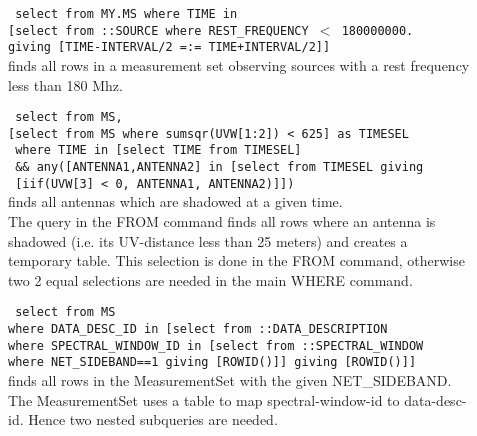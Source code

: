 \begin{description}
  \item[] \texttt{ select from MY.MS where TIME in}
      \\\texttt{[select from ::SOURCE where REST\_FREQUENCY $<$ 180000000.}
      \\\texttt{giving [TIME-INTERVAL/2 =:= TIME+INTERVAL/2]]}
      \\finds all rows in a measurement set observing sources with a
      rest frequency less than 180 Mhz.

  \item[] \texttt{ select from MS,}
      \\\texttt{[select from MS where sumsqr(UVW[1:2]) < 625] as TIMESEL}
      \\\texttt{ where TIME in [select TIME from TIMESEL]}
      \\\texttt{   \&\& any([ANTENNA1,ANTENNA2] in [select from TIMESEL giving}
      \\\texttt{                      [iif(UVW[3] < 0, ANTENNA1, ANTENNA2)]])}
      \\finds all antennas which are shadowed at a given time.
      \\The query in the FROM command finds all rows where an antenna
      is shadowed (i.e. its UV-distance less than 25 meters) and
      creates a temporary table. This selection is done in the FROM
      command, otherwise two 2 equal selections are needed in the main
      WHERE command.
      
  \item[] \texttt{ select from MS}
      \\\texttt{where DATA\_DESC\_ID in [select from ::DATA\_DESCRIPTION}
      \\\texttt{where SPECTRAL\_WINDOW\_ID in [select from ::SPECTRAL\_WINDOW}
      \\\texttt{where NET\_SIDEBAND==1 giving [ROWID()]] giving [ROWID()]]}
      \\finds all rows in the MeasurementSet with the given
      NET\_SIDEBAND.
      \\The MeasurementSet uses a table to map spectral-window-id to
      data-desc-id. Hence two nested subqueries are needed.
\end{description}

